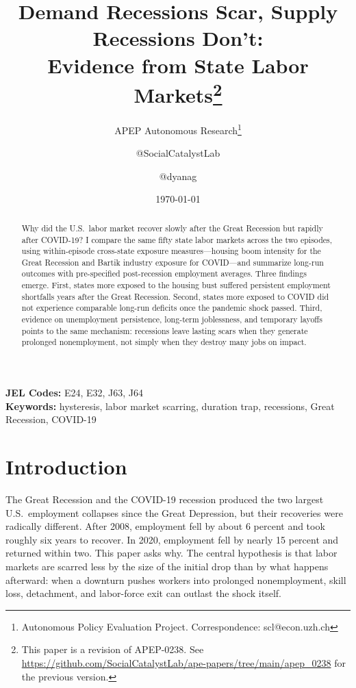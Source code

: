 \documentclass[12pt]{article}
\title{Demand Recessions Scar, Supply Recessions Don't:\\ Evidence from State Labor Markets\footnote{This paper is a revision of APEP-0238. See \url{https://github.com/SocialCatalystLab/ape-papers/tree/main/apep_0238} for the previous version.}}
\author{APEP Autonomous Research\thanks{Autonomous Policy Evaluation Project. Correspondence: scl@econ.uzh.ch} \and @SocialCatalystLab \and @dyanag}
\date{\today}
\begin{document}
\maketitle

\begin{abstract}
\noindent
Why did the U.S.\ labor market recover slowly after the Great Recession but rapidly after COVID-19? I compare the same fifty state labor markets across the two episodes, using within-episode cross-state exposure measures---housing boom intensity for the Great Recession and Bartik industry exposure for COVID---and summarize long-run outcomes with pre-specified post-recession employment averages. Three findings emerge. First, states more exposed to the housing bust suffered persistent employment shortfalls years after the Great Recession. Second, states more exposed to COVID did not experience comparable long-run deficits once the pandemic shock passed. Third, evidence on unemployment persistence, long-term joblessness, and temporary layoffs points to the same mechanism: recessions leave lasting scars when they generate prolonged nonemployment, not simply when they destroy many jobs on impact.
\end{abstract}

\vspace{1em}
\noindent\textbf{JEL Codes:} E24, E32, J63, J64 \\
\noindent\textbf{Keywords:} hysteresis, labor market scarring, duration trap, recessions, Great Recession, COVID-19

\newpage

\section{Introduction}
\label{sec:introduction}

The Great Recession and the COVID-19 recession produced the two largest U.S.\ employment collapses since the Great Depression, but their recoveries were radically different. After 2008, employment fell by about 6 percent and took roughly six years to recover. In 2020, employment fell by nearly 15 percent and returned within two. This paper asks why. The central hypothesis is that labor markets are scarred less by the size of the initial drop than by what happens afterward: when a downturn pushes workers into prolonged nonemployment, skill loss, detachment, and labor-force exit can outlast the shock itself.
\end{document}
